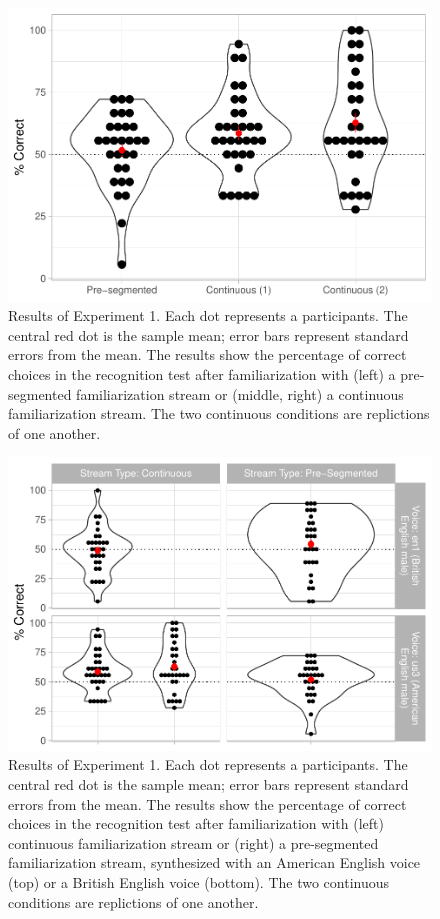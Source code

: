 \documentclass[
]{article}
\begin{document}
\begin{figure}

{\centering \includegraphics[width=0.8\linewidth]{segmentation_recall_combined_for_revision2_files/figure-latex/stats-london-stats.3x.us.segm.cont.plot-1} 

}

\caption{Results of Experiment 1. Each dot represents a participants. The central red dot is the sample mean; error bars represent standard errors from the mean. The results show the percentage of correct choices in the recognition test after familiarization with (left) a pre-segmented familiarization stream or (middle, right) a continuous familiarization stream. The two continuous conditions are replictions of one another.}\label{fig:stats-london-stats.3x.us.segm.cont.plot}
\end{figure}

\begin{figure}

{\centering \includegraphics[width=0.8\linewidth]{segmentation_recall_combined_for_revision2_files/figure-latex/stats-london-stats.3x.us.en.segm.cont.combined.plot-1} 

}

\caption{Results of Experiment 1. Each dot represents a participants. The central red dot is the sample mean; error bars represent standard errors from the mean. The results show the percentage of correct choices in the recognition test after familiarization with (left) continuous familiarization stream or (right) a pre-segmented familiarization stream, synthesized with an American English voice (top) or a British English voice (bottom). The two continuous conditions are replictions of one another.}\label{fig:stats-london-stats.3x.us.en.segm.cont.combined.plot}
\end{figure}
\end{document}
